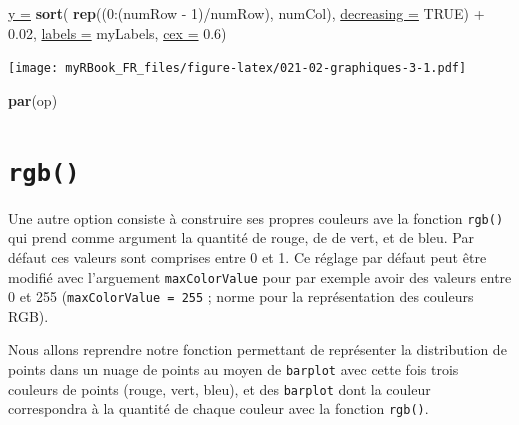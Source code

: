 \documentclass[twoside,symmetric]{book}
\newenvironment{Shaded}{}{}
\newcommand{\DataTypeTok}[1]{\underline{#1}}
\newcommand{\DecValTok}[1]{#1}
\newcommand{\FloatTok}[1]{#1}
\newcommand{\KeywordTok}[1]{\textbf{#1}}
\newcommand{\NormalTok}[1]{#1}
\newcommand{\OperatorTok}[1]{#1}
\newcommand{\OtherTok}[1]{#1}
\newcommand{\StringTok}[1]{#1}
\begin{document}
\begin{Shaded}
\begin{Highlighting}[]
  \DataTypeTok{y =} \KeywordTok{sort}\NormalTok{(}
    \KeywordTok{rep}\NormalTok{((}\DecValTok{0}\OperatorTok{:}\NormalTok{(numRow }\OperatorTok{-}\StringTok{ }\DecValTok{1}\NormalTok{)}\OperatorTok{/}\NormalTok{numRow), numCol), }
    \DataTypeTok{decreasing =} \OtherTok{TRUE}\NormalTok{) }\OperatorTok{+}\StringTok{ }\FloatTok{0.02}\NormalTok{,}
  \DataTypeTok{labels =}\NormalTok{ myLabels, }
  \DataTypeTok{cex =} \FloatTok{0.6}\NormalTok{)}
\end{Highlighting}
\end{Shaded}

\texttt{[image: myRBook\_FR\_files/figure-latex/021-02-graphiques-3-1.pdf]}

\begin{Shaded}
\begin{Highlighting}[]
\KeywordTok{par}\NormalTok{(op)}
\end{Highlighting}
\end{Shaded}

\hypertarget{rgb}{%
\section{\texorpdfstring{\texttt{rgb()}}{rgb()}}\label{rgb}}

Une autre option consiste à construire ses propres couleurs ave la fonction \texttt{rgb()} qui prend comme argument la quantité de rouge, de de vert, et de bleu. Par défaut ces valeurs sont comprises entre 0 et 1. Ce réglage par défaut peut être modifié avec l'arguement \texttt{maxColorValue} pour par exemple avoir des valeurs entre 0 et 255 (\texttt{maxColorValue\ =\ 255} ; norme pour la représentation des couleurs RGB).

Nous allons reprendre notre fonction permettant de représenter la distribution de points dans un nuage de points au moyen de \texttt{barplot} avec cette fois trois couleurs de points (rouge, vert, bleu), et des \texttt{barplot} dont la couleur correspondra à la quantité de chaque couleur avec la fonction \texttt{rgb()}.
\end{document}
